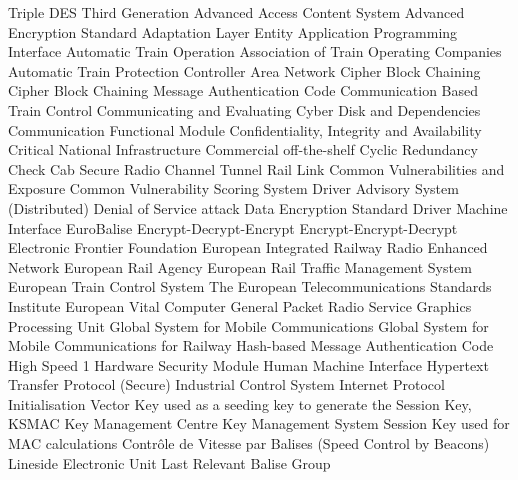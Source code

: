 \normalsize
\begin{acronym}[SCEPTICS] %
 {Triple DES}
 {Third Generation}
 {Advanced Access Content System}
 {Advanced Encryption Standard}
 {Adaptation Layer Entity}
 {Application Programming Interface}
 {Automatic Train Operation}
 {Association of Train Operating Companies}
 {Automatic Train Protection}
 {Controller Area Network}
 {Cipher Block Chaining}
 {Cipher Block Chaining Message Authentication Code}
 {Communication Based Train Control}
 {Communicating and Evaluating Cyber Disk and Dependencies}
 {Communication Functional Module}
 {Confidentiality, Integrity and Availability}
 {Critical National Infrastructure}
 {Commercial off-the-shelf}
 {Cyclic Redundancy Check}
 {Cab Secure Radio}
 {Channel Tunnel Rail Link}
 {Common Vulnerabilities and Exposure}
 {Common Vulnerability Scoring System}
 {Driver Advisory System}
 {(Distributed) Denial of Service attack}
 {Data Encryption Standard}
 {Driver Machine Interface}
 {EuroBalise}
 {Encrypt-Decrypt-Encrypt}
 {Encrypt-Encrypt-Decrypt}
 {Electronic Frontier Foundation}
 {European Integrated Railway Radio Enhanced Network}
 {European Rail Agency}
 {European Rail Traffic Management System}
 {European Train Control System}
 {The European Telecommunications Standards Institute}
 {European Vital Computer}
 {General Packet Radio Service}
 {Graphics Processing Unit}
 {Global System for Mobile Communications}
 {Global System for Mobile Communications for Railway}
 {Hash-based Message Authentication Code}
 {High Speed 1}
 {Hardware Security Module}
 {Human Machine Interface}
 {Hypertext Transfer Protocol (Secure)}
 {Industrial Control System}
 {Internet Protocol}
 {Initialisation Vector}
 {Key used as a seeding key to generate the Session Key, KSMAC}
 {Key Management Centre}
 {Key Management System}
 {Session Key used for MAC calculations}
 {Contr\^ole de Vitesse par Balises (Speed Control by Beacons)}
 {Lineside Electronic Unit}
 {Last Relevant Balise Group}

\end{acronym}
